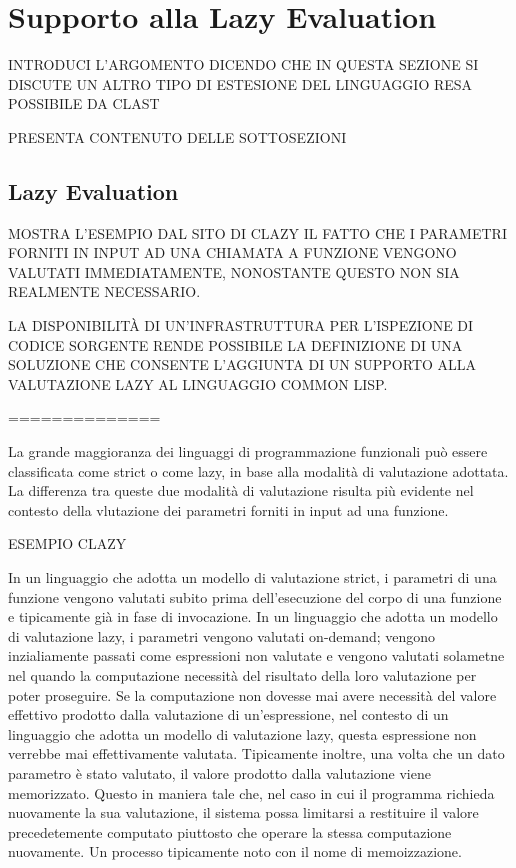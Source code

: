 \section{Supporto alla Lazy Evaluation}
\label{lazy-evaluation}

INTRODUCI L'ARGOMENTO DICENDO CHE IN QUESTA SEZIONE SI DISCUTE UN ALTRO TIPO DI ESTESIONE DEL LINGUAGGIO RESA POSSIBILE DA CLAST

PRESENTA CONTENUTO DELLE SOTTOSEZIONI

\subsection{Lazy Evaluation}

MOSTRA L'ESEMPIO DAL SITO DI CLAZY IL FATTO CHE I PARAMETRI FORNITI IN INPUT AD UNA CHIAMATA A FUNZIONE VENGONO VALUTATI IMMEDIATAMENTE, NONOSTANTE QUESTO NON SIA REALMENTE NECESSARIO.

LA DISPONIBILITÀ DI UN'INFRASTRUTTURA PER L'ISPEZIONE DI CODICE SORGENTE RENDE POSSIBILE LA DEFINIZIONE DI UNA SOLUZIONE CHE CONSENTE L'AGGIUNTA DI UN SUPPORTO ALLA VALUTAZIONE LAZY AL LINGUAGGIO COMMON LISP.

==============

La grande maggioranza dei linguaggi di programmazione funzionali può essere classificata come strict o come lazy, in base alla modalità di valutazione adottata. La differenza tra queste due modalità di valutazione risulta più evidente nel contesto della vlutazione dei parametri forniti in input ad una funzione.

ESEMPIO CLAZY

In un linguaggio che adotta un modello di valutazione strict, i parametri di una funzione vengono valutati subito prima dell'esecuzione del corpo di una funzione e tipicamente già in fase di invocazione. In un linguaggio che adotta un modello di valutazione lazy, i parametri vengono valutati on-demand; vengono inzialiamente passati come espressioni non valutate e vengono valutati solametne nel quando la computazione necessità del risultato della loro valutazione per poter proseguire. Se la computazione non dovesse mai avere necessità del valore effettivo prodotto dalla valutazione di un'espressione, nel contesto di un linguaggio che adotta un modello di valutazione lazy, questa espressione non verrebbe mai effettivamente valutata. Tipicamente inoltre, una volta che un dato parametro è stato valutato, il valore prodotto dalla valutazione viene memorizzato. Questo in maniera tale che, nel caso in cui il programma richieda nuovamente la sua valutazione, il sistema possa limitarsi a restituire il valore precedetemente computato piuttosto che operare la stessa computazione nuovamente. Un processo tipicamente noto con il nome di memoizzazione. \cite{mic68}

